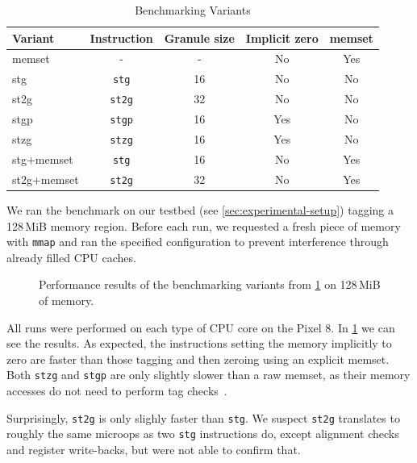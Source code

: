 \begin{table}[h]
    \centering
    \small
    \begin{tabular}{| l || c | c |  c | c |}
        \hline
        \textbf{Variant} & \textbf{Instruction} & \textbf{Granule size} & \textbf{Implicit zero} & \textbf{memset} \\
        \hline
        memset      & -             & -  & No  & Yes \\
        stg         & \texttt{stg}  & 16 & No  & No  \\
        st2g        & \texttt{st2g} & 32 & No  & No  \\
        stgp        & \texttt{stgp} & 16 & Yes & No  \\
        stzg        & \texttt{stzg} & 16 & Yes & No  \\
        stg+memset  & \texttt{stg}  & 16 & No  & Yes \\
        st2g+memset & \texttt{st2g} & 32 & No  & Yes \\
        \hline
    \end{tabular}
    \caption{Benchmarking Variants}
    \label{tab:stg-instructions}
\end{table}

We ran the benchmark on our testbed (see \cref{sec:experimental-setup}) tagging a 128\,MiB memory region.
Before each run, we requested a fresh piece of memory with \texttt{mmap} and ran the specified configuration to prevent interference through already filled CPU caches.

\begin{figure}[h]
    \centering
    
    \caption{Performance results of the benchmarking variants from \cref{tab:stg-instructions} on 128\,MiB of memory.}
    \label{fig:stg-performance}
\end{figure}

All runs were performed on each type of CPU core on the Pixel 8.
In \cref{fig:stg-performance} we can see the results.
As expected, the instructions setting the memory implicitly to zero are faster than those tagging and then zeroing using an explicit memset.
Both \texttt{stzg} and \texttt{stgp} are only slightly slower than a raw memset, as their memory accesses do not need to perform tag checks~\cite{ARMA2024Arch64}.

Surprisingly, \texttt{st2g} is only slighly faster than \texttt{stg}.
We suspect \texttt{st2g} translates to roughly the same microops as two \texttt{stg} instructions do, except alignment checks and register write-backs, but were not able to confirm that.

